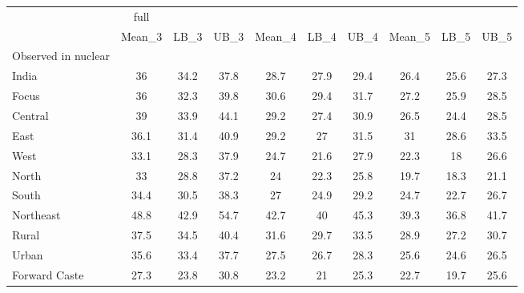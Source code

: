 \begin{tabular}{l*{9}{c}}
\toprule
                    &        full&            &            &            &            &            &            &            &            \\
                    &      Mean\_3&        LB\_3&        UB\_3&      Mean\_4&        LB\_4&        UB\_4&      Mean\_5&        LB\_5&        UB\_5\\
\midrule
Observed in nuclear &            &            &            &            &            &            &            &            &            \\
India               &          36&        34.2&        37.8&        28.7&        27.9&        29.4&        26.4&        25.6&        27.3\\
Focus               &          36&        32.3&        39.8&        30.6&        29.4&        31.7&        27.2&        25.9&        28.5\\
Central             &          39&        33.9&        44.1&        29.2&        27.4&        30.9&        26.5&        24.4&        28.5\\
East                &        36.1&        31.4&        40.9&        29.2&          27&        31.5&          31&        28.6&        33.5\\
West                &        33.1&        28.3&        37.9&        24.7&        21.6&        27.9&        22.3&          18&        26.6\\
North               &          33&        28.8&        37.2&          24&        22.3&        25.8&        19.7&        18.3&        21.1\\
South               &        34.4&        30.5&        38.3&          27&        24.9&        29.2&        24.7&        22.7&        26.7\\
Northeast           &        48.8&        42.9&        54.7&        42.7&          40&        45.3&        39.3&        36.8&        41.7\\
Rural               &        37.5&        34.5&        40.4&        31.6&        29.7&        33.5&        28.9&        27.2&        30.7\\
Urban               &        35.6&        33.4&        37.7&        27.5&        26.7&        28.3&        25.6&        24.6&        26.5\\
Forward Caste       &        27.3&        23.8&        30.8&        23.2&          21&        25.3&        22.7&        19.7&        25.6\\

\end{tabular}
